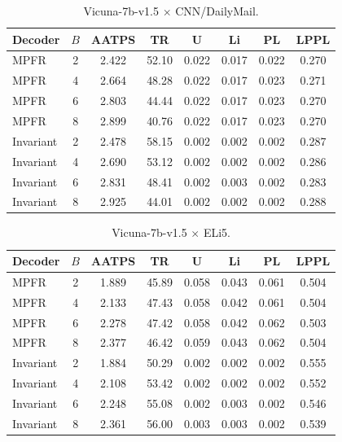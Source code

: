 \begin{table}[h]
\centering
\small
\caption{Vicuna-7b-v1.5 $\times$ CNN/DailyMail.}
\label{tab:full-vicuna-cnn}
\begin{tabular}{l c c c c c c c}
\toprule
Decoder & $B$ & AATPS & TR & U & Li & PL & LPPL \\
\midrule
MPFR      & 2 & 2.422 & 52.10 & 0.022 & 0.017 & 0.022 & 0.270 \\
MPFR      & 4 & 2.664 & 48.28 & 0.022 & 0.017 & 0.023 & 0.271 \\
MPFR      & 6 & 2.803 & 44.44 & 0.022 & 0.017 & 0.023 & 0.270 \\
MPFR      & 8 & 2.899 & 40.76 & 0.022 & 0.017 & 0.023 & 0.270 \\
Invariant & 2 & 2.478 & 58.15 & 0.002 & 0.002 & 0.002 & 0.287 \\
Invariant & 4 & 2.690 & 53.12 & 0.002 & 0.002 & 0.002 & 0.286 \\
Invariant & 6 & 2.831 & 48.41 & 0.002 & 0.003 & 0.002 & 0.283 \\
Invariant & 8 & 2.925 & 44.01 & 0.002 & 0.002 & 0.002 & 0.288 \\
\bottomrule
\end{tabular}
\end{table}

\begin{table}[h]
\centering
\small
\caption{Vicuna-7b-v1.5 $\times$ ELi5.}
\label{tab:full-vicuna-eli5}
\begin{tabular}{l c c c c c c c}
\toprule
Decoder & $B$ & AATPS & TR & U & Li & PL & LPPL \\
\midrule
MPFR      & 2 & 1.889 & 45.89 & 0.058 & 0.043 & 0.061 & 0.504 \\
MPFR      & 4 & 2.133 & 47.43 & 0.058 & 0.042 & 0.061 & 0.504 \\
MPFR      & 6 & 2.278 & 47.42 & 0.058 & 0.042 & 0.062 & 0.503 \\
MPFR      & 8 & 2.377 & 46.42 & 0.059 & 0.043 & 0.062 & 0.504 \\
Invariant & 2 & 1.884 & 50.29 & 0.002 & 0.002 & 0.002 & 0.555 \\
Invariant & 4 & 2.108 & 53.42 & 0.002 & 0.002 & 0.002 & 0.552 \\
Invariant & 6 & 2.248 & 55.08 & 0.002 & 0.003 & 0.002 & 0.546 \\
Invariant & 8 & 2.361 & 56.00 & 0.003 & 0.003 & 0.002 & 0.539 \\
\bottomrule
\end{tabular}
\end{table}


